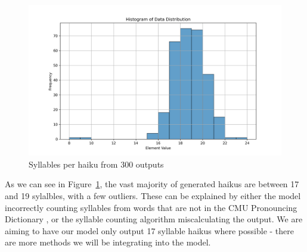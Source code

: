 \documentclass{article} %
\begin{document}
\begin{figure}[h]
\begin{center}
\includegraphics[width=1\textwidth]{Figs/plot.png}
\end{center}
\caption{Syllables per haiku from 300 outputs}
\label{fig:plot2}
\end{figure}

As we can see in Figure~\ref{fig:plot2}, the vast majority of generated haikus are between 17 and 19 sylalbles, with a few outliers.
These can be explained by either the model incorrectly counting syllables from words that are not
in the CMU Pronouncing Dictionary \citep{cmu_pronouncing_dictionary}, or the syllable counting algorithm
miscalculating the output.
We are aiming to have our model only output 17 syllable haikus where possible - there are more methods we will be integrating into the model.
\end{document}
